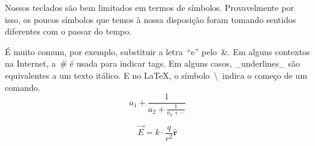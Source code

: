 \documentclass[12pt,a4paper,oneside]{article}
\begin{document}
Nossos teclados são bem limitados em termos de símbolos. Provavelmente por isso, os poucos símbolos que temos à nossa disposição foram tomando sentidos diferentes com o passar do tempo.

É muito comum, por exemplo, substituir a letra~``e'' pelo~\&. Em alguns contextos na Internet, a~\# é usada para indicar tags. Em alguns casos, \_underlines\_ são equivalentes a um texto itálico. E no \LaTeX, o símbolo~\textbackslash\ indica o começo de um comando.
$$ a_1 + \frac{1}{a_2 + \frac{1}{a_3 + \cdots}} $$

\[
\vec{E} = k \cdot \frac{q}{r^2}\hat{\mathbf{r}}
\]
\end{document}

